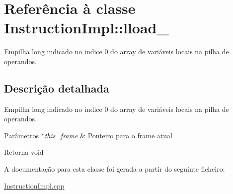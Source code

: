\hypertarget{class_instruction_impl_1_1lload__0}{}\section{Referência à classe Instruction\+Impl\+:\+:lload\+\_}
\label{class_instruction_impl_1_1lload__0}


Empilha long indicado no indice 0 do array de variáveis locais na pilha de operandos.  




\subsection{Descrição detalhada}
Empilha long indicado no indice 0 do array de variáveis locais na pilha de operandos. 


\begin{DoxyParams}{Parâmetros}
{\em $\ast$this\+\_\+frame} & Ponteiro para o frame atual \\
\hline
\end{DoxyParams}
\begin{DoxyReturn}{Retorna}
void 
\end{DoxyReturn}


A documentação para esta classe foi gerada a partir do seguinte ficheiro\+:\begin{DoxyCompactItemize}
\item 
\hyperlink{_instruction_impl_8cpp}{Instruction\+Impl.\+cpp}\end{DoxyCompactItemize}
